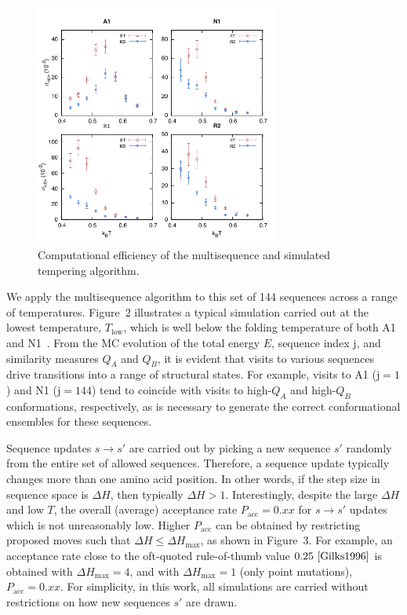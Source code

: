 \documentclass[%
 aip,
rsi,%
 amsmath,amssymb,
 reprint,%
]{revtex4-1}
\newcommand	 {\sbar}	{{s}}
\newcommand	 {\Tlow}	{{T_\mathrm{low}}}
\begin{document}
\begin{figure}
\includegraphics[width=8.0cm]{Stderr}
\caption{Computational efficiency of the multisequence and simulated tempering algorithm.}
\end{figure}


We apply the multisequence algorithm to this set of 144 sequences across a range of temperatures. Figure~2 illustrates a typical simulation carried out at the lowest temperature, $\Tlow$, which is well below the folding temperature of both A1 and N1~\cite{Holzgrafe2014,Holzgrafe2015}. From the MC evolution of the total energy $E$, sequence index j, and similarity measures $Q_A$ and $Q_B$, it is evident that visits to various sequences drive transitions into a range of structural states. For example, visits to A1 ($\mathrm{j}=1$) and N1 ($\mathrm{j}=144$) tend to coincide with visits to high-$Q_A$ and high-$Q_B$ conformations, respectively, as is necessary to generate the correct conformational ensembles for these sequences.

Sequence updates $\sbar\rightarrow\sbar'$ are carried out by picking a new sequence $\sbar'$ randomly from the entire set of allowed sequences. Therefore, a sequence update typically changes more than one amino acid position. In other words, if the step size in sequence space is $\Delta H$, then typically $\Delta H>1$. Interestingly, despite the large $\Delta H$ and low $T$, the overall (average) acceptance rate $P_\mathrm{acc}=0.xx$ for $\sbar\rightarrow\sbar'$ updates which is not unreasonably low. Higher $P_\mathrm{acc}$ can be obtained by restricting proposed moves such that $\Delta H\le\Delta H_\mathrm{max}$, as shown in Figure~3. For example, an acceptance rate close to the oft-quoted rule-of-thumb value $0.25~\cite{Gilks1996} $ is obtained with $\Delta H_\mathrm{max}=4$, and with $\Delta H_\mathrm{max} = 1$ (only point mutations), $P_\mathrm{acc}=0.xx$. For simplicity, in this work, all simulations are carried without restrictions on how new sequences $\sbar'$ are drawn. 
\end{document}
